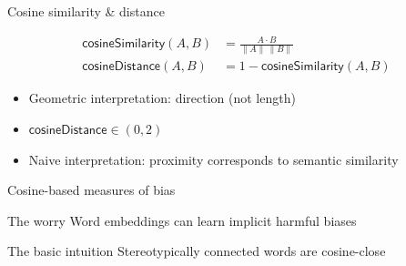 \documentclass[
  10pt,
  ignorenonframetext,
  x11names, dvipsnames, bibspacing,natbib, table]{beamer}
\begin{document}
\begin{frame}{Cosine similarity \& distance}
\protect\hypertarget{cosine-similarity-distance}{}
\vspace{-4mm}

\begin{align} \tag{Sim}
\mathsf{cosineSimilarity}(A,B) & = \frac{A \cdot B}{\lVert  A \rVert \,\lVert B \rVert}
\\
\tag{Distance}
\mathsf{cosineDistance}(A,B) &  = 1 - \mathsf{cosineSimilarity}(A,B)
\end{align}

\begin{itemize}
\item
  Geometric interpretation: direction (not length)
\item
  \(\mathsf{cosineDistance}\in (0, 2)\)
\item
  Naive interpretation: proximity corresponds to semantic similarity
\end{itemize}
\end{frame}

\begin{frame}{Cosine-based measures of bias}
\protect\hypertarget{cosine-based-measures-of-bias}{}
\begin{block}{The worry}
\protect\hypertarget{the-worry}{}
Word embeddings can learn implicit harmful biases

\pause
\end{block}

\begin{block}{The basic intuition}
\protect\hypertarget{the-basic-intuition}{}
Stereotypically connected words are cosine-close
\end{block}
\end{frame}
\end{document}
